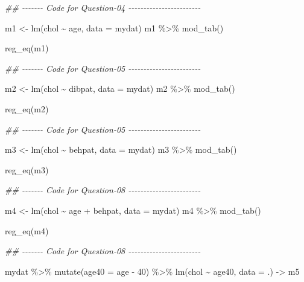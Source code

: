\documentclass[
  12pt,
  oneside]{article}
\newenvironment{Shaded}{}{}
\newcommand{\AttributeTok}[1]{\textcolor[rgb]{0.49,0.56,0.16}{#1}}
\newcommand{\DecValTok}[1]{\textcolor[rgb]{0.25,0.63,0.44}{#1}}
\newcommand{\DocumentationTok}[1]{\textcolor[rgb]{0.73,0.13,0.13}{\textit{#1}}}
\newcommand{\FunctionTok}[1]{\textcolor[rgb]{0.02,0.16,0.49}{#1}}
\newcommand{\NormalTok}[1]{#1}
\newcommand{\OtherTok}[1]{\textcolor[rgb]{0.00,0.44,0.13}{#1}}
\newcommand{\SpecialCharTok}[1]{\textcolor[rgb]{0.25,0.44,0.63}{#1}}
\begin{document}
\begin{Shaded}
\begin{Highlighting}[]
\DocumentationTok{\#\# {-}{-}{-}{-}{-}{-}{-} Code for Question{-}04 {-}{-}{-}{-}{-}{-}{-}{-}{-}{-}{-}{-}{-}{-}{-}{-}{-}{-}{-}{-}{-}{-}{-}{-}}

\NormalTok{m1 }\OtherTok{\textless{}{-}} \FunctionTok{lm}\NormalTok{(chol }\SpecialCharTok{\textasciitilde{}}\NormalTok{ age, }\AttributeTok{data =}\NormalTok{ mydat)}
\NormalTok{m1 }\SpecialCharTok{\%\textgreater{}\%} \FunctionTok{mod\_tab}\NormalTok{()}

\FunctionTok{reg\_eq}\NormalTok{(m1)}

\DocumentationTok{\#\# {-}{-}{-}{-}{-}{-}{-} Code for Question{-}05 {-}{-}{-}{-}{-}{-}{-}{-}{-}{-}{-}{-}{-}{-}{-}{-}{-}{-}{-}{-}{-}{-}{-}{-}}

\NormalTok{m2 }\OtherTok{\textless{}{-}} \FunctionTok{lm}\NormalTok{(chol }\SpecialCharTok{\textasciitilde{}}\NormalTok{ dibpat, }\AttributeTok{data =}\NormalTok{ mydat)}
\NormalTok{m2 }\SpecialCharTok{\%\textgreater{}\%} \FunctionTok{mod\_tab}\NormalTok{()}

\FunctionTok{reg\_eq}\NormalTok{(m2)}

\DocumentationTok{\#\# {-}{-}{-}{-}{-}{-}{-} Code for Question{-}05 {-}{-}{-}{-}{-}{-}{-}{-}{-}{-}{-}{-}{-}{-}{-}{-}{-}{-}{-}{-}{-}{-}{-}{-}}

\NormalTok{m3 }\OtherTok{\textless{}{-}} \FunctionTok{lm}\NormalTok{(chol }\SpecialCharTok{\textasciitilde{}}\NormalTok{ behpat, }\AttributeTok{data =}\NormalTok{ mydat)}
\NormalTok{m3 }\SpecialCharTok{\%\textgreater{}\%} \FunctionTok{mod\_tab}\NormalTok{()}

\FunctionTok{reg\_eq}\NormalTok{(m3)}

\DocumentationTok{\#\# {-}{-}{-}{-}{-}{-}{-} Code for Question{-}08 {-}{-}{-}{-}{-}{-}{-}{-}{-}{-}{-}{-}{-}{-}{-}{-}{-}{-}{-}{-}{-}{-}{-}{-}}

\NormalTok{m4 }\OtherTok{\textless{}{-}} \FunctionTok{lm}\NormalTok{(chol }\SpecialCharTok{\textasciitilde{}}\NormalTok{ age }\SpecialCharTok{+}\NormalTok{ behpat, }\AttributeTok{data =}\NormalTok{ mydat)}
\NormalTok{m4 }\SpecialCharTok{\%\textgreater{}\%} \FunctionTok{mod\_tab}\NormalTok{()}

\FunctionTok{reg\_eq}\NormalTok{(m4)}

\DocumentationTok{\#\# {-}{-}{-}{-}{-}{-}{-} Code for Question{-}08 {-}{-}{-}{-}{-}{-}{-}{-}{-}{-}{-}{-}{-}{-}{-}{-}{-}{-}{-}{-}{-}{-}{-}{-}}

\NormalTok{mydat }\SpecialCharTok{\%\textgreater{}\%}
  \FunctionTok{mutate}\NormalTok{(}\AttributeTok{age40 =}\NormalTok{ age }\SpecialCharTok{{-}} \DecValTok{40}\NormalTok{) }\SpecialCharTok{\%\textgreater{}\%}
  \FunctionTok{lm}\NormalTok{(chol }\SpecialCharTok{\textasciitilde{}}\NormalTok{ age40, }\AttributeTok{data =}\NormalTok{ .) }\OtherTok{{-}\textgreater{}}\NormalTok{ m5}


\end{Highlighting}
\end{Shaded}
\end{document}
